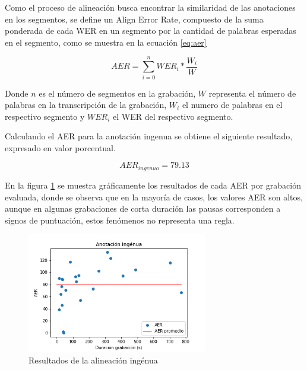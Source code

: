 Como el proceso de alineación busca encontrar la similaridad de las anotaciones en los segmentos, se define un Align Error Rate, compuesto de la suma ponderada de cada WER en un segmento por la cantidad de palabras esperadas en el segmento, como se muestra en la ecuación \ref{eq:aer}




\begin{equation}
    \label{eq:aer}
    AER = \sum_{i=0}^{n}{WER_i * \frac{W_i}{W}}
\end{equation}

Donde $n$ es el número de segmentos en la grabación, $W$ representa el número de palabras en la transcripción de la grabación, $W_i$ el numero de palabras en el respectivo segmento y $WER_i$ el WER del respectivo segmento.

Calculando el AER para la anotación ingenua se obtiene el siguiente resultado, expresado en valor porcentual.

\begin{equation}
    AER_{ingenuo} = 79.13
\end{equation}

En la figura \ref{img:aer_ingenuo} se muestra gráficamente los resultados de cada AER por grabación evaluada, donde se observa que en la mayoría de casos, los valores AER son altos, aunque en algunas grabaciones de corta duración las pausas corresponden a signos de puntuación, estos fenómenos no representa una regla.

\begin{figure}[H]
\caption{Resultados de la alineación ingénua}
\label{img:aer_ingenuo}
\begin{center}
\includegraphics[width=0.7\textwidth]{imagenes/04_01_aer_ingenuo.png}
\end{center}
\end{figure}

